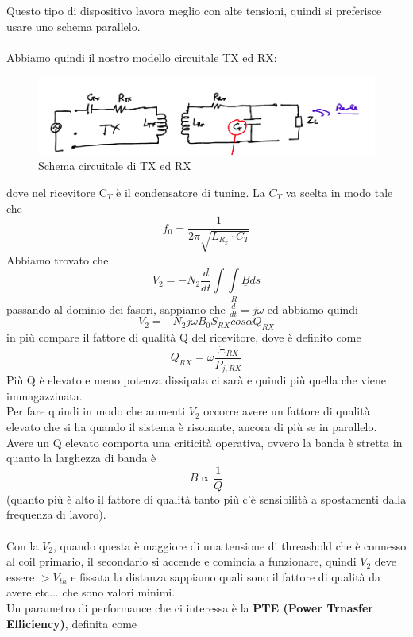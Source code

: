 \documentclass[oneside, 12pt]{extbook}
\begin{document}
Questo tipo di dispositivo lavora meglio con alte tensioni, quindi si preferisce usare uno schema parallelo.\\\\Abbiamo quindi il nostro modello circuitale TX ed RX:
\begin{figure}
	\includegraphics[scale=0.5]{immagini/schema_circuitale.png}
	\caption{Schema circuitale di TX ed RX}
\end{figure}
dove nel ricevitore C$_T$ è il condensatore di tuning. La $C_T$ va scelta in modo tale che 
\begin{equation}
	f_0 = \frac{1}{2\pi\sqrt{L_{R_x} \cdot C_T}}
\end{equation}
Abbiamo trovato che
\begin{equation}
	V_2 = -N_2 \frac{d}{dt} \int\int\limits_{R} \underline{B} ds
\end{equation}
passando al dominio dei fasori, sappiamo che $\frac{d}{dt} = j\omega$ ed abbiamo quindi 
\begin{equation}
	V_2 = -N_2 j\omega B_0 S_{RX} cos\alpha Q_{RX}
\end{equation}
in più compare il fattore di qualità Q del ricevitore, dove è definito come 
\begin{equation}
	Q_{RX} = \omega \frac{\Xi_{RX}}{P_{j, RX}}
\end{equation}
Più Q è elevato e meno potenza dissipata ci sarà e quindi più quella che viene immagazzinata.\\Per fare quindi in modo che aumenti $V_2$ occorre avere un fattore di qualità elevato che si ha quando il sistema è risonante, ancora di più se in parallelo.\\Avere un Q elevato comporta una criticità operativa, ovvero la banda è stretta in quanto la larghezza di banda è 
\begin{equation}
	B \propto \frac{1}{Q}
\end{equation}
(quanto più è alto il fattore di qualità tanto più c'è sensibilità a spostamenti dalla frequenza di lavoro).\\\\Con la $V_2$, quando questa è maggiore di una tensione di threashold che è connesso al coil primario, il secondario si accende e comincia a funzionare, quindi $V_2$ deve essere $> V_{th}$ e fissata la distanza sappiamo quali sono il fattore di qualità da avere etc... che sono valori minimi.\\Un parametro di performance che ci interessa è la \textbf{PTE (Power Trnasfer Efficiency)}, definita come 
\end{document}
